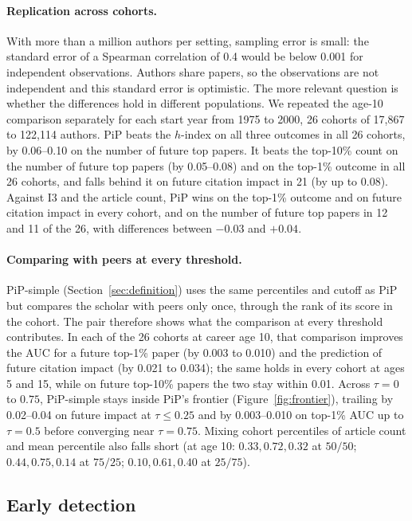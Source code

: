 \documentclass[11pt]{article}
\begin{document}
\paragraph{Replication across cohorts.} With more than a million authors per setting, sampling error is small: the
standard error of a Spearman correlation of 0.4 would be below 0.001 for independent observations. Authors share
papers, so the observations are not independent and this standard error is optimistic. The more relevant question is
whether the differences hold in different populations. We repeated the age-10 comparison separately for each start
year from 1975 to 2000, 26 cohorts of 17,867 to 122,114 authors. PiP beats the $h$-index on all three outcomes in all
26 cohorts, by 0.06--0.10 on the number of future top papers. It beats the top-10\% count on the number of future top
papers (by 0.05--0.08) and on the top-1\% outcome in all 26 cohorts, and falls behind it on future citation impact in
21 (by up to 0.08). Against I3 and the article count, PiP wins on the top-1\% outcome and on future citation impact in
every cohort, and on the number of future top papers in 12 and 11 of the 26, with differences between $-0.03$ and
$+0.04$.

\paragraph{Comparing with peers at every threshold.} PiP-simple (Section~\ref{sec:definition}) uses the same percentiles
and cutoff as PiP but compares the scholar with peers only once, through the rank of its score in the cohort. The pair
therefore shows what the comparison at every threshold contributes. In each of the 26 cohorts at career age 10, that
comparison improves the AUC for a future top-1\% paper (by 0.003 to 0.010) and the prediction of future citation impact
(by 0.021 to 0.034); the same holds in every cohort at ages 5 and 15, while on future top-10\% papers the two stay
within 0.01. Across $\tau = 0$ to $0.75$, PiP-simple stays inside PiP's frontier (Figure~\ref{fig:frontier}), trailing
by 0.02--0.04 on future impact at $\tau \le 0.25$ and by 0.003--0.010 on top-1\% AUC up to $\tau = 0.5$ before
converging near $\tau = 0.75$. Mixing cohort percentiles of article count and mean percentile also falls short (at age
10: $0.33, 0.72, 0.32$ at $50/50$; $0.44, 0.75, 0.14$ at $75/25$; $0.10, 0.61, 0.40$ at $25/75$).

\subsection{Early detection}
\label{sec:early}
\end{document}
